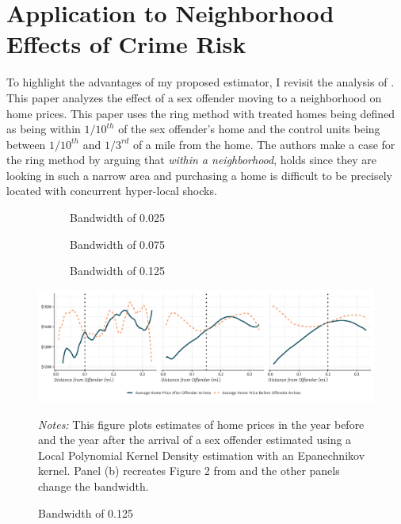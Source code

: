 \documentclass[10pt]{article}
\begin{document}
\section{Application to Neighborhood Effects of Crime Risk}

To highlight the advantages of my proposed estimator, I revisit the analysis of \citet{Linden_Rockoff_2008}. This paper analyzes the effect of a sex offender moving to a neighborhood on home prices. This paper uses the ring method with treated homes being defined as being within $1/10^{th}$ of the sex offender's home and the control units being between $1/10^{th}$ and $1/3^{rd}$ of a mile from the home. The authors make a case for the ring method by arguing that \emph{within a neighborhood},  holds since they are looking in such a narrow area and purchasing a home is difficult to be precisely located with concurrent hyper-local shocks. 


\begin{figure}[htb!]
    \caption{Price Gradient of Distance from Offender}\label{fig:lr_nonparametric}


    \begin{subfigure}{0.33\textwidth}
        \caption{Bandwidth of 0.025}
    \end{subfigure}
    \begin{subfigure}{0.33\textwidth}
        \caption{Bandwidth of 0.075}
    \end{subfigure}
    \begin{subfigure}{0.33\textwidth}
        \caption{Bandwidth of 0.125}
    \end{subfigure}
    
    \vspace{-3mm}
    \includegraphics[width=\textwidth]{../../figures/linden_rockoff_nonparametric.pdf}
    

    {\footnotesize{\it Notes:} This figure plots estimates of home prices in the year before and the year after the arrival of a sex offender estimated using a Local Polynomial Kernel Density estimation with an Epanechnikov kernel. Panel (b) recreates Figure 2 from \citet{Linden_Rockoff_2008} and the other panels change the bandwidth.}
\end{figure}
\end{document}
